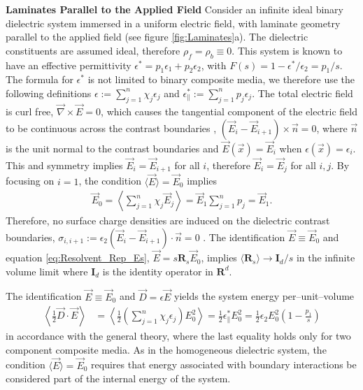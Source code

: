 \documentclass[english,12pt]{ttuthes}
\begin{document}
\vspace{0.1in}\noindent\textbf{Laminates Parallel to the Applied Field}\newline
%
Consider an infinite ideal binary dielectric system immersed in a
uniform electric field, with laminate geometry parallel to the applied
field (see figure \ref{fig:Laminates}a). The dielectric constituents
are assumed ideal, therefore $\rho_f=\rho_b\equiv0$. This system is known
\cite{Scaife-1989} to have an effective permittivity
$\epsilon^*=p_1\epsilon_1+p_2\epsilon_2$, with $F(s)=1-\epsilon^*/\epsilon_2=p_1/s$. The formula for
$\epsilon^*$ is not limited to binary composite media, we therefore use the
following definitions $\epsilon:=\sum_{j=1}^n\chi_j\epsilon_j$ and
$\epsilon^*_\parallel:=\sum_{j=1}^np_j\epsilon_j$. The total electric field is curl free,
$\vec{\nabla}\times\vec{E}=0$, which causes the tangential component of the
electric field to be continuous across the contrast boundaries
\cite{Jackson-1999}, $(\vec{E}_i-\vec{E}_{i+1})\times\vec{n}=0$, where 
$\vec{n}$ is the unit normal to the contrast boundaries and
$\vec{E}(\vec{x})=\vec{E}_i$ when $\epsilon(\vec{x})=\epsilon_i$. This and
symmetry implies $\vec{E}_i=\vec{E}_{i+1}$ for all $i$, therefore
$\vec{E}_i=\vec{E}_j$ for all $i,j$. By focusing on $i=1$, the
condition $\langle\vec{E}\rangle=\vec{E}_0$ implies  
%
\begin{align*}
  \vec{E}_0=\left\langle\sum_{j=1}^n\chi_j\vec{E}_j\right\rangle
             =\vec{E}_1\sum_{j=1}^np_j=\vec{E}_1.
\end{align*}
%
Therefore, no surface charge densities are induced on the dielectric
contrast boundaries, $\sigma_{i,i+1}:=\epsilon_2(\vec{E}_i-\vec{E}_{i+1})\cdot\vec{n}=0$
\cite{Jackson-1999}. The identification $\vec{E}\equiv\vec{E}_0$ and
equation \eqref{eq:Resolvent_Rep_Es},
$\vec{E}=s\mathbf{R}_s\vec{E}_0$, implies $\langle\mathbf{R}_s\rangle \to\mathbf{I}_d/s$ in the 
infinite volume limit where $\mathbf{I}_d$ is the identity operator
in $\mathbf{R}^d$.

The identification $\vec{E}\equiv\vec{E}_0$ and
$\vec{D}=\epsilon\vec{E}$ yields the system energy per--unit--volume
%
\begin{align}
  \left\langle\frac{1}{2}\vec{D}\cdot\vec{E}\right\rangle
             &=\left\langle\frac{1}{2}\left(\sum_{j=1}^n\chi_j\epsilon_j\right)E_0^2\right\rangle
             =\frac{1}{2}\epsilon^*_\parallel E_0^2
             =\frac{1}{2}\epsilon_2E_0^2\left(1-\frac{p_1}{s}\right) 
\end{align}
%
in accordance with the general theory, where the last equality holds
only for two component composite media. As in the homogeneous
dielectric system, the condition $\langle\vec{E}\rangle=\vec{E}_0$ requires that
energy associated with boundary interactions be considered part of the
internal energy of the system.
\end{document}
